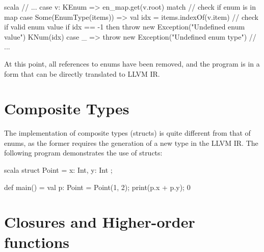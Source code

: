 \begin{code}{scala}
    // ...
    case v: KEnum =>
        en_map.get(v.root) match {
            // check if enum is in map
            case Some(EnumType(items)) =>
                val idx = items.indexOf(v.item)
                // check if valid enum value
                if idx == -1 then
                    throw new Exception("Undefined enum value")
                KNum(idx)
            case _ => throw new Exception("Undefined enum type")
        }
    // ...
\end{code}

At this point, all references to enums have been removed, and the program is in a form that can be
directly translated to LLVM IR.

\section{Composite Types}

The implementation of composite types (structs) is quite different from that of enums, as the former
requires the generation of a new type in the LLVM IR\@. The following program demonstrates the use
of structs:

\begin{code}{scala}
    struct Point = {
        x: Int,
        y: Int
    };

    def main() = {
        val p: Point = Point(1, 2);
        print(p.x + p.y);
        0
    }
\end{code}


\section{Closures and Higher-order functions}
